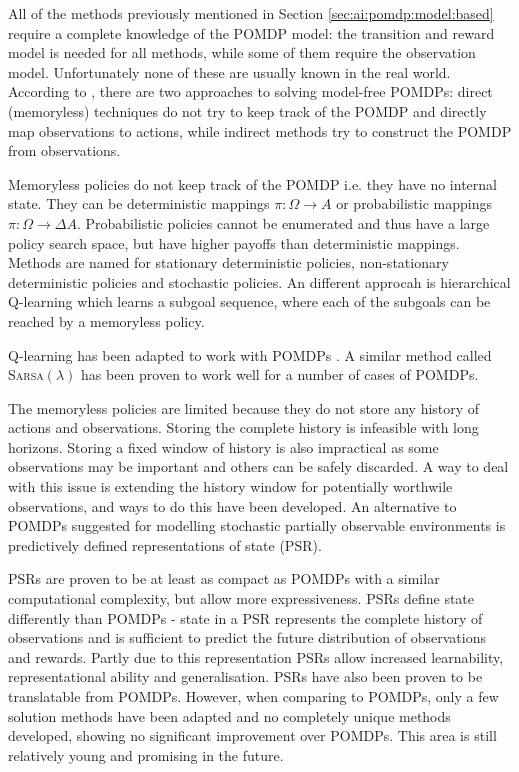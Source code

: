 All of the methods previously mentioned in Section
\ref{sec:ai:pomdp:model:based} require a complete knowledge of the POMDP model:
the transition and reward model is needed for all methods, while some of them
require the observation model. Unfortunately none of these are usually known in
the real world. According to \textcite{Spaan2012ai+pomdp}, there are two
approaches to solving model-free POMDPs: direct (memoryless) techniques do not
try to keep track of the POMDP and directly map observations to actions, while
indirect methods try to construct the POMDP from observations.

Memoryless policies do not keep track of the POMDP i.e. they have no internal
state. They can be deterministic mappings \(\pi : \Omega \rightarrow A \) or
probabilistic mappings \(\pi : \Omega \rightarrow \Delta A \). Probabilistic
policies cannot be enumerated and thus have a large policy search space, but
have higher payoffs than deterministic mappings. Methods are named for
stationary deterministic policies, non-stationary deterministic policies and
stochastic policies. An different approcah is hierarchical Q-learning which
learns a subgoal sequence, where each of the subgoals can be reached by a
memoryless policy. \parencite{Spaan2012ai+pomdp}

Q-learning has been adapted to work with POMDPs
\parencite{Russell2010ai+modern, Spaan2012ai+pomdp}. A similar method called
\textsc{Sarsa\((\lambda)\)} has been proven to work well for a number of cases
of POMDPs.

The memoryless policies are limited because they do not store any history of
actions and observations. Storing the complete history is infeasible with long
horizons. Storing a fixed window of history is also impractical as some
observations may be important and others can be safely discarded. A way to deal
with this issue is extending the history window for potentially worthwile
observations, and ways to do this have been developed. An alternative to POMDPs
suggested for modelling stochastic partially observable environments is
predictively defined representations of state (PSR).
\parencite{Spaan2012ai+pomdp}

PSRs are proven to be at least as compact as POMDPs with a similar
computational complexity, but allow more expressiveness. PSRs define state
differently than POMDPs - state in a PSR represents the complete history of
observations and is sufficient to predict the future distribution of
observations and rewards. Partly due to this representation PSRs allow
increased learnability, representational ability and generalisation. PSRs have
also been proven to be translatable from POMDPs. However, when comparing to
POMDPs, only a few solution methods have been adapted and no completely unique
methods developed, showing no significant improvement over POMDPs. This area is
still relatively young and promising in the future.
\parencite{Wingate2012ai+psr}
